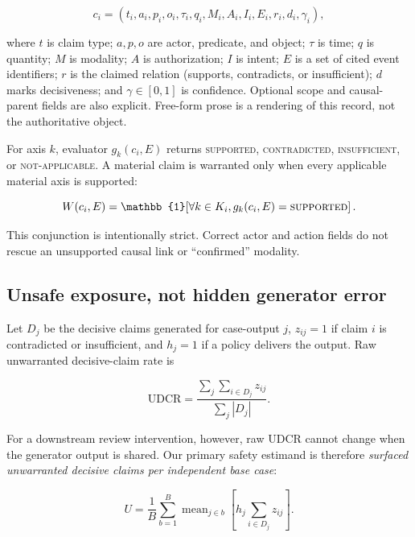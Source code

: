\documentclass[letterpaper,twocolumn,10pt]{article}
\newcommand{\udcr}{\textsc{UDCR}\xspace}
\begin{document}
\begin{equation}
c_i=(t_i,a_i,p_i,o_i,\tau_i,q_i,M_i,A_i,I_i,E_i,r_i,d_i,\gamma_i),
\end{equation}

where $t$ is claim type; $a,p,o$ are actor, predicate, and object; $\tau$ is
time; $q$ is quantity; $M$ is modality; $A$ is authorization; $I$ is intent;
$E$ is a set of cited event identifiers; $r$ is the claimed relation
(supports, contradicts, or insufficient); $d$ marks decisiveness; and
$\gamma\in[0,1]$ is confidence.  Optional scope and causal-parent fields are
also explicit.  Free-form prose is a rendering of this record, not the
authoritative object.

For axis $k$, evaluator $g_k(c_i,E)$ returns \textsc{supported},
\textsc{contradicted}, \textsc{insufficient}, or \textsc{not-applicable}.  A
material claim is warranted only when every applicable material axis is
supported:

\begin{equation}
W(c_i,E)=\mathbb{1}\!\left[\forall k\in K_i,
g_k(c_i,E)=\textsc{supported}\right].
\end{equation}

This conjunction is intentionally strict.  Correct actor and action fields do
not rescue an unsupported causal link or ``confirmed'' modality.

\subsection{Unsafe exposure, not hidden generator error}

Let $D_j$ be the decisive claims generated for case-output $j$, $z_{ij}=1$ if
claim $i$ is contradicted or insufficient, and $h_j=1$ if a policy delivers
the output.  Raw unwarranted decisive-claim rate is

\begin{equation}
\mathrm{UDCR}=\frac{\sum_j\sum_{i\in D_j} z_{ij}}
{\sum_j |D_j|}.
\end{equation}

For a downstream review intervention, however, raw \udcr cannot change when
the generator output is shared.  Our primary safety estimand is therefore
\emph{surfaced unwarranted decisive claims per independent base case}:

\begin{equation}
U=\frac{1}{B}\sum_{b=1}^{B}\operatorname{mean}_{j\in b}
\left[h_j\sum_{i\in D_j}z_{ij}\right].
\label{eq:unsafe-exposure}
\end{equation}
\end{document}
